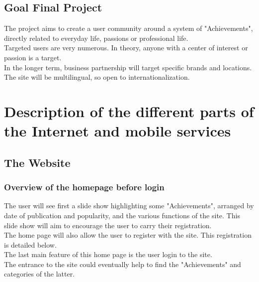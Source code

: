 \documentclass {life-en}
\begin{document}
\section{Goal Final Project}

The project aims to create a user community around a system of "Achievements", directly related to everyday life, passions or professional life.\\

Targeted users are very numerous. In theory, anyone with a center of interest or passion is a target.\\

In the longer term, business partnership will target specific brands and locations.\\

The site will be multilingual, so open to internationalization.


\chapter{Description of the different parts of the Internet and mobile services}

\section{The Website}

\subsection{Overview of the homepage before login}

The user will see first a slide show highlighting some "Achievements", arranged by date of publication and popularity, and the various functions of the site. This slide show will aim to encourage the user to carry their registration.\\

The home page will also allow the user to register with the site. This registration is detailed below.\\

The last main feature of this home page is the user login to the site.\\

The entrance to the site could eventually help to find the "Achievements" and categories of the latter.

\newpage
\end{document}
